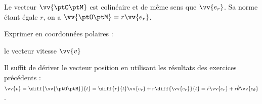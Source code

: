 \reponse{\reponseC{}}

\begin{corrige}
	Le vecteur $\vv{\ptO\ptM}$ est colinéaire et de même sens que $\vv{e_r}$. Sa norme étant égale $r$, on a $\vv{\ptO \ptM} = r\vv{e_r}$.
\end{corrige}


\finEntrainement





\hauteurLargeurCadreReponse		{9mm}{6.5cm}
\initialisationEntrainement


\debutEntrainement

Exprimer en coordonnées polaires :

\begin{enonce}
	 le vecteur vitesse $\vv{v}$ 		
\end{enonce}


\begin{corrige}
Il suffit de dériver le vecteur position en utilisant les résultats des exercices précédents : $\vv{v}=\diff{\vv{\ptO\ptM}}{t}=\diff{r}{t}\vv{e_r}+r\diff{\vv{e_r}}{t}=\dot{r} \vv{e_r} + r\dot{\theta} \vv{e_\theta}$.
\end{corrige}



